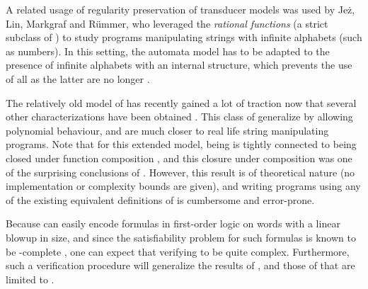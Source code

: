 A related usage of regularity preservation of transducer models was used by
Jeż, Lin, Markgraf and Rümmer, who leveraged the \emph{rational functions} (a
strict subclass of ) to study programs
manipulating strings with infinite alphabets (such as numbers). In this
setting, the automata model has to be adapted to the presence of infinite
alphabets with an internal structure, which prevents the use of all  as the latter are no longer .

\AP The relatively old model of  \cite{ENMA02} has recently gained a lot of traction now that
several other characterizations have been obtained
\cite{bojanczyk2018polyregular,bojanczyk2019string}. This class of
 generalize  by
allowing polynomial behaviour, and are much closer to real life string
manipulating programs. Note that for this extended model, being  is tightly connected to being closed under function composition
\cite[Proposition III.3]{FIRELH25}, and this closure under composition was one of the surprising
conclusions of \cite{bojanczyk2018polyregular}. However, this result is of
theoretical nature (no implementation or complexity bounds are given), and
writing programs using any of the existing equivalent definitions of
 is cumbersome and error-prone.

Because  can easily encode formulas in first-order
logic on words with a linear blowup in size, and since the satisfiability
problem for such formulas is known to be \TOWER-complete \cite[Theorem
13.5]{REINH02}, one can expect that verifying  to be
quite complex. Furthermore, such a verification procedure will generalize the
results of \cite{ALCE11}, and those of \cite{CHLRW19} that are limited to
.


